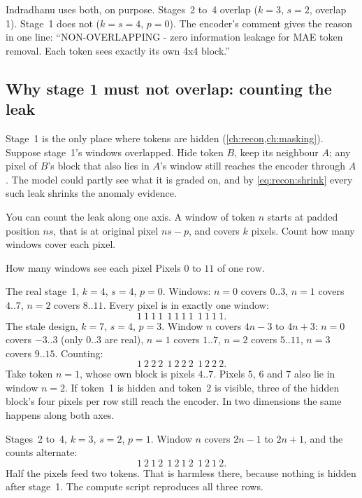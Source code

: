 Indradhanu uses both, on purpose. Stages~2 to~4 overlap ($k=3$, $s=2$, overlap 1). Stage~1 does not
($k = s = 4$, $p = 0$). The encoder's comment gives the reason in one line: ``NON-OVERLAPPING - zero
information leakage for MAE token removal. Each token sees exactly its own 4x4 block.''


\subsection{Why stage 1 must not overlap: counting the leak}

Stage~1 is the only place where tokens are hidden (\cref{ch:recon,ch:masking}). Suppose stage~1's
windows overlapped. Hide token $B$, keep its neighbour $A$; any pixel of $B$'s block that also lies in
$A$'s window still reaches the encoder through $A$. The model could partly see what it is graded on,
and by \cref{eq:recon:shrink} every such leak shrinks the anomaly evidence.

You can count the leak along one axis. A window of token $n$ starts at padded position $ns$, that is at
original pixel $ns - p$, and covers $k$ pixels. Count how many windows cover each pixel.

\begin{worked}[label={we:patchembed:leak}]{How many windows see each pixel}
Pixels $0$ to $11$ of one row.

The real stage~1, $k=4$, $s=4$, $p=0$. Windows: $n=0$ covers $0..3$, $n=1$ covers $4..7$, $n=2$ covers
$8..11$. Every pixel is in exactly one window:
\[
1\ 1\ 1\ 1\ \ 1\ 1\ 1\ 1\ \ 1\ 1\ 1\ 1 .
\]
The stale design, $k=7$, $s=4$, $p=3$. Window $n$ covers $4n-3$ to $4n+3$: $n=0$ covers $-3..3$ (only
$0..3$ are real), $n=1$ covers $1..7$, $n=2$ covers $5..11$, $n=3$ covers $9..15$. Counting:
\[
1\ 2\ 2\ 2\ \ 1\ 2\ 2\ 2\ \ 1\ 2\ 2\ 2 .
\]
Take token $n=1$, whose own block is pixels $4..7$. Pixels $5$, $6$ and $7$ also lie in window $n=2$. If
token~1 is hidden and token~2 is visible, three of the hidden block's four pixels per row still reach the
encoder. In two dimensions the same happens along both axes.

Stages~2 to~4, $k=3$, $s=2$, $p=1$. Window $n$ covers $2n-1$ to $2n+1$, and the counts alternate:
\[
1\ 2\ 1\ 2\ \ 1\ 2\ 1\ 2\ \ 1\ 2\ 1\ 2 .
\]
Half the pixels feed two tokens. That is harmless there, because nothing is hidden after stage~1.
The compute script reproduces all three rows\tagC.
\end{worked}

